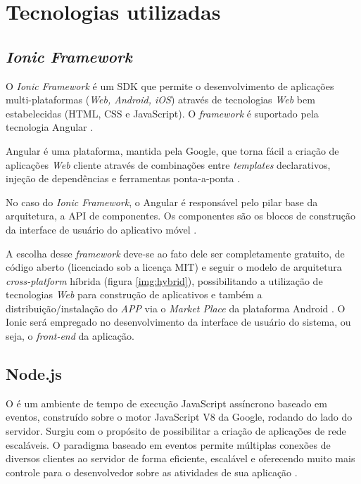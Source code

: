 \section{Tecnologias  utilizadas}

\subsection{\textit{Ionic Framework}} \label{subsec:Ionic}

O \textit{Ionic Framework} é um SDK que permite o desenvolvimento de aplicações multi-plataformas (\textit{Web, Android, iOS}) através de tecnologias \textit{Web} bem estabelecidas (HTML, CSS e JavaScript). O \textit{framework} é suportado pela tecnologia Angular \cite{SITEIONIC}.

Angular é uma plataforma, mantida pela Google, que torna fácil a criação de aplicações \textit{Web} cliente através de combinações entre \textit{templates} declarativos, injeção de dependências e ferramentas ponta-a-ponta \cite{SITEANGULAR}.

No caso do \textit{Ionic Framework}, o Angular é responsável pelo pilar base da arquitetura, a API de componentes. Os componentes são os blocos de construção da interface de usuário do aplicativo móvel \cite{SITEIONIC}.

A escolha desse \textit{framework} deve-se ao fato dele ser completamente gratuito, de código aberto (licenciado sob a licença MIT) e seguir o modelo de arquitetura \textit{cross-platform} híbrida (figura \ref{img:hybrid}), possibilitando a utilização de tecnologias \textit{Web} para construção de aplicativos e também a distribuição/instalação do \textit{APP} via o \textit{Market Place} da plataforma Android \cite{SITEIONIC}. O Ionic será empregado no desenvolvimento da interface de usuário do sistema, ou seja, o \textit{front-end} da aplicação.


\newpage

\subsection{Node.js} \label{subsec:NodeJs}

O  é um ambiente de tempo de execução JavaScript assíncrono baseado em eventos, construído sobre o motor JavaScript V8 da Google, rodando do lado do servidor. Surgiu com o propósito de possibilitar a criação de aplicações de rede escaláveis. O paradigma baseado em eventos permite múltiplas conexões de diversos clientes ao servidor de forma eficiente, escalável e oferecendo muito mais controle para o desenvolvedor sobre as atividades de sua aplicação \cite{tilkov2010node}.
    
